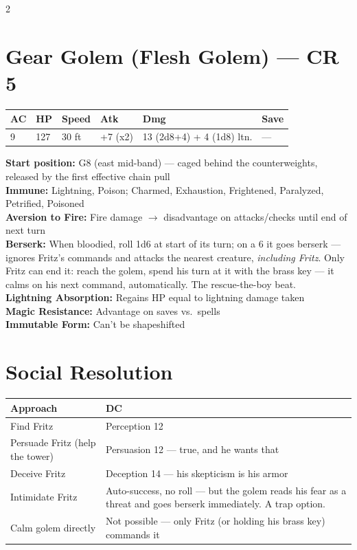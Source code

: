 \documentclass[10pt,letterpaper]{article}
\begin{document}
\begin{multicols}{2}

\section*{Gear Golem (Flesh Golem) --- CR 5}

\begin{tabularx}{\columnwidth}{@{}XXXXXX@{}}
\toprule
AC & HP & Speed & Atk & Dmg & Save \\
\midrule
9 & 127 & 30 ft & +7 (x2) & 13 (2d8+4) + 4 (1d8) ltn. & --- \\
\bottomrule
\end{tabularx}

\vspace{4pt}

\textbf{Start position:} G8 (east mid-band) --- caged behind the counterweights, released by the first effective chain pull\\
\textbf{Immune:} Lightning, Poison; Charmed, Exhaustion, Frightened, Paralyzed, Petrified, Poisoned\\
\textbf{Aversion to Fire:} Fire damage $\rightarrow$ disadvantage on attacks/checks until end of next turn\\
\textbf{Berserk:} When bloodied, roll 1d6 at start of its turn; on a 6 it goes berserk --- ignores Fritz's commands and attacks the nearest creature, \textit{including Fritz}. Only Fritz can end it: reach the golem, spend his turn at it with the brass key --- it calms on his next command, automatically. The rescue-the-boy beat.\\
\textbf{Lightning Absorption:} Regains HP equal to lightning damage taken\\
\textbf{Magic Resistance:} Advantage on saves vs.\ spells\\
\textbf{Immutable Form:} Can't be shapeshifted

\section*{Social Resolution}

\begin{tabularx}{\columnwidth}{@{}lX@{}}
\toprule
\textbf{Approach} & \textbf{DC} \\
\midrule
Find Fritz & Perception 12 \\
Persuade Fritz (help the tower) & Persuasion 12 --- true, and he wants that \\
Deceive Fritz & Deception 14 --- his skepticism is his armor \\
Intimidate Fritz & Auto-success, no roll --- but the golem reads his fear as a threat and goes berserk immediately. A trap option. \\
Calm golem directly & Not possible --- only Fritz (or holding his brass key) commands it \\
\bottomrule
\end{tabularx}


\end{multicols}
\end{document}
